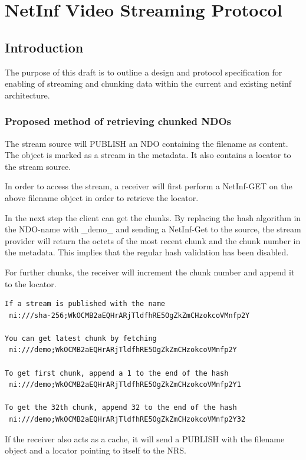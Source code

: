 \section {NetInf Video Streaming Protocol}\label{VideoDraft}

\subsection{Introduction}

The purpose of this draft is to outline a design and protocol specification for enabling of streaming and chunking data within the current and existing netinf architecture.

\subsubsection{Proposed method of retrieving chunked NDOs}

The stream source will PUBLISH an NDO containing the filename as content. The object is marked as a stream in the metadata. It also contains a locator to the stream source.

In order to access the stream, a receiver will first perform a NetInf-GET on the above filename object in order to retrieve the locator. 

In the next step the client can get the chunks. By replacing the hash algorithm in the NDO-name with \_demo\_ and sending a NetInf-Get to the source, the stream provider will return the octets of the most recent chunk and the chunk number in the metadata. This implies that the regular hash validation has been disabled.

For further chunks, the receiver will increment the chunk number and append it to the locator.
\begin{verbatim}
If a stream is published with the name
 ni:///sha-256;WkOCMB2aEQHrARjTldfhRE5OgZkZmCHzokcoVMnfp2Y

You can get latest chunk by fetching
 ni:///demo;WkOCMB2aEQHrARjTldfhRE5OgZkZmCHzokcoVMnfp2Y

To get first chunk, append a 1 to the end of the hash
 ni:///demo;WkOCMB2aEQHrARjTldfhRE5OgZkZmCHzokcoVMnfp2Y1

To get the 32th chunk, append 32 to the end of the hash
 ni:///demo;WkOCMB2aEQHrARjTldfhRE5OgZkZmCHzokcoVMnfp2Y32
\end{verbatim}
 
If the receiver also acts as a cache, it will send a PUBLISH with the filename object and a locator pointing to itself to the NRS.
\\

